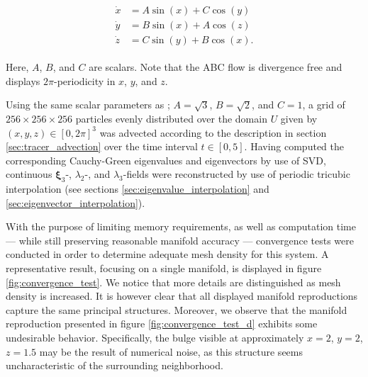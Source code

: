 \begin{align}\label{eq:steady_ABC_flow}
\begin{aligned}
\dot{x} &= A\sin(x) + C\cos(y)\\
\dot{y} &= B\sin(x) + A\cos(z)\\
\dot{z} &= C\sin(y) + B\cos(x).
\end{aligned}
\end{align}

\noindent Here, $A$, $B$, and $C$ are scalars. Note that the ABC flow is divergence free and displays $2\pi$-periodicity in $x$, $y$, and $z$.

Using the same scalar parameters as \cite{Oettinger}; $A=\sqrt{3}$, $B=\sqrt{2}$, and $C=1$, a grid of $256\times256\times256$ particles evenly distributed over the domain $U$ given by $(x,y,z)\in [0,2\pi]^3$ was advected according to the description in section \ref{sec:tracer_advection} over the time interval $t\in [0,5]$. Having computed the corresponding Cauchy-Green eigenvalues and eigenvectors by use of SVD, continuous $\bm{\xi}_3$-, $\lambda_2$-, and $\lambda_3$-fields were reconstructed by use of periodic tricubic interpolation (see sections \ref{sec:eigenvalue_interpolation} and \ref{sec:eigenvector_interpolation}).

With the purpose of limiting memory requirements, as well as computation time --- while still preserving reasonable manifold accuracy --- convergence tests were conducted in order to determine adequate mesh density for this system. A representative result, focusing on a single manifold, is displayed in figure \ref{fig:convergence_test}. We notice that more details are distinguished as mesh density is increased. It is however clear that all displayed manifold reproductions capture the same principal structures. Moreover, we observe that the manifold reproduction presented in figure \ref{fig:convergence_test_d} exhibits some undesirable behavior. Specifically, the bulge visible at approximately $x=2$, $y=2$, $z=1.5$ may be the result of numerical noise, as this structure seems uncharacteristic of the surrounding neighborhood.

